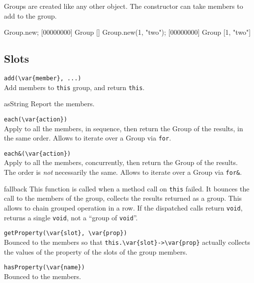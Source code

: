 Groups are created like any other object. The constructor can
take members to add to the group.

\begin{urbiscript}
Group.new;
[00000000] Group []
Group.new(1, "two");
[00000000] Group [1, "two"]
\end{urbiscript}

\subsection{Slots}

\begin{urbiscriptapi}
\item \lstinline|add(\var{member}, ...)|\\
  Add members to \lstinline|this| group, and return \lstinline|this|.

\item[asString]
  Report the members.

\item \lstinline|each(\var{action})|\\
  Apply  to all the members, in sequence, then return the
  Group of the results, in the same order.  Allows to iterate over a
  Group via \lstinline|for|.

\item \lstinline|each&(\var{action})|\\
  Apply  to all the members, concurrently, then return the
  Group of the results.  The order is \emph{not} necessarily the same.
  Allows to iterate over a Group via \lstinline|for&|.

\item[fallback]
  This function is called when a method call on \lstinline|this|
  failed.  It bounces the call to the members of the group, collects
  the results returned as a group.  This allows to chain grouped
  operation in a row.  If the dispatched calls return
  \lstinline|void|, returns a single \lstinline|void|, not a ``group
  of \lstinline|void|''.

\item \lstinline|getProperty(\var{slot}, \var{prop})|\\
  Bounced to the members so that
  \lstinline|this.\var{slot}->\var{prop}| actually collects the values
  of the property  of the slots  of the group
  members.

\item \lstinline|hasProperty(\var{name})|\\
  Bounced to the members.


\end{urbiscriptapi}
